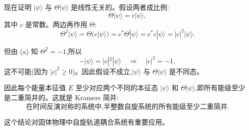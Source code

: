 \begin{question}
\begin{solution}
		现在证明 $|\psi\rangle$ 与 $\Theta|\psi\rangle$ 是线性无关的。假设两者成比例:
		\[
		\Theta|\psi\rangle = c|\psi\rangle,
		\]
		其中 $c$ 是常数。两边再作用 $\Theta$:
		\[
		\Theta^2|\psi\rangle = \Theta(c|\psi\rangle) = c^*\Theta|\psi\rangle = c^*c|\psi\rangle = |c|^2|\psi\rangle.
		\]

		但由 (a) 知 $\Theta^2=-1$,所以
		\[
		-|\psi\rangle = |c|^2|\psi\rangle \quad\Longrightarrow\quad |c|^2 = -1,
		\]
		这不可能(因为 $|c|^2\ge0$)。因此假设不成立,$|\psi\rangle$ 与 $\Theta|\psi\rangle$ 是不同态。

		因此每个能量本征值 $E$ 至少对应两个不同的本征态 $|\psi\rangle$ 和 $\Theta|\psi\rangle$,即所有能级至少是二重简并的。这就是 Kramers 简并:
		\[
		\boxed{\text{在时间反演对称的系统中,半整数自旋系统的所有能级至少二重简并}}.
		\]

		这个结论对固体物理中自旋轨道耦合系统有重要应用。
		\end{solution}
\end{question}
